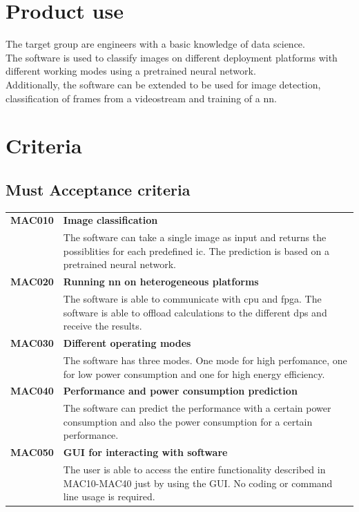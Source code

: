 \documentclass[parskip=full]{scrartcl}
\begin{document}
\section{Product use}
The target group are engineers with a basic knowledge of data science.\\
The software is used to classify images on different deployment platforms with different working modes using a pretrained neural network.\\
Additionally, the software can be extended to be used for image detection, classification of frames from a videostream and training of a \gls{nn}.\\


\section{Criteria}
\subsection{Must Acceptance criteria}
\begin{tabular}{p{2cm}p{12cm}}
\textbf{MAC010} & \textbf{Image classification} \\
& The software can take a single image as input and returns the possiblities for each predefined \gls{ic}. The prediction is based on a pretrained neural network.\\
\textbf{MAC020} & \textbf{Running \gls{nn} on heterogeneous platforms} \\
& The software is able to communicate with \gls{cpu} and \gls{fpga}. The software is able to offload calculations to the different \glspl{dp} and receive the results.\\
\textbf{MAC030} & \textbf{Different operating modes} \\
& The software has three modes. One mode for high perfomance, one for low \gls{power consumption} and one for high energy efficiency. \\
\textbf{MAC040} & \textbf{Performance and \gls{power consumption} prediction}\\
& The software can predict the \gls{performance} with a certain \gls{power consumption} and also the \gls{power consumption} for a certain \gls{performance}.\\
\textbf{MAC050} & \textbf{GUI for interacting with software} \\
& The user is able to access the entire functionality described in MAC10-MAC40 just by using the GUI. No coding or command line usage is required.
\end{tabular}
\end{document}
